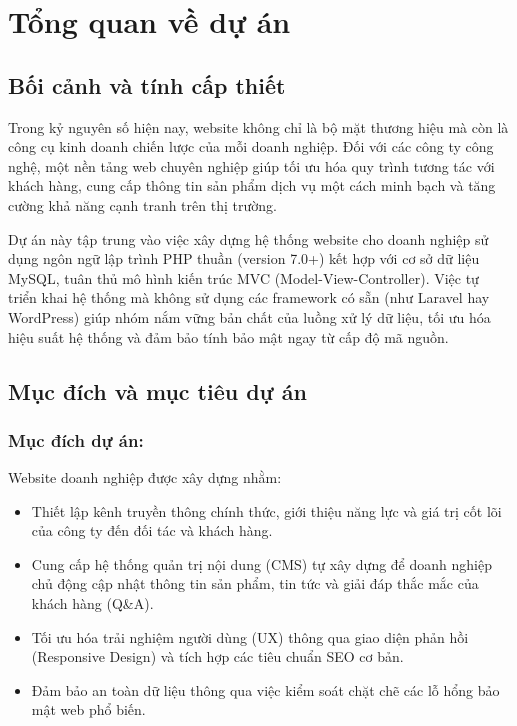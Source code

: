 \section{Tổng quan về dự án}

\subsection{Bối cảnh và tính cấp thiết}
Trong kỷ nguyên số hiện nay, website không chỉ là bộ mặt thương hiệu mà còn là công cụ kinh doanh chiến lược của mỗi doanh nghiệp. Đối với các công ty công nghệ, một nền tảng web chuyên nghiệp giúp tối ưu hóa quy trình tương tác với khách hàng, cung cấp thông tin sản phẩm dịch vụ một cách minh bạch và tăng cường khả năng cạnh tranh trên thị trường. 

Dự án này tập trung vào việc xây dựng hệ thống website cho doanh nghiệp sử dụng ngôn ngữ lập trình PHP thuần (version 7.0+) kết hợp với cơ sở dữ liệu MySQL, tuân thủ mô hình kiến trúc MVC (Model-View-Controller). Việc tự triển khai hệ thống mà không sử dụng các framework có sẵn (như Laravel hay WordPress) giúp nhóm nắm vững bản chất của luồng xử lý dữ liệu, tối ưu hóa hiệu suất hệ thống và đảm bảo tính bảo mật ngay từ cấp độ mã nguồn.

\subsection{Mục đích và mục tiêu dự án}

\subsubsection{Mục đích dự án:}
Website doanh nghiệp được xây dựng nhằm:
\begin{itemize}
    \item Thiết lập kênh truyền thông chính thức, giới thiệu năng lực và giá trị cốt lõi của công ty đến đối tác và khách hàng.
    \item Cung cấp hệ thống quản trị nội dung (CMS) tự xây dựng để doanh nghiệp chủ động cập nhật thông tin sản phẩm, tin tức và giải đáp thắc mắc của khách hàng (Q\&A).
    \item Tối ưu hóa trải nghiệm người dùng (UX) thông qua giao diện phản hồi (Responsive Design) và tích hợp các tiêu chuẩn SEO cơ bản.
    \item Đảm bảo an toàn dữ liệu thông qua việc kiểm soát chặt chẽ các lỗ hổng bảo mật web phổ biến.
\end{itemize}

